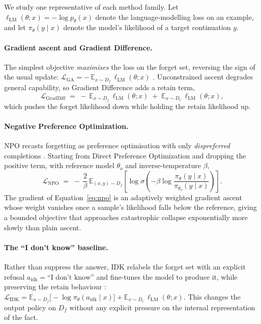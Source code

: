 We study one representative of each method family. Let $\ell_{\mathrm{LM}}(\theta; x) = -\log
p_\theta(x)$ denote the language-modelling loss on an example, and let $\pi_\theta(y\mid x)$ denote the
model's likelihood of a target continuation $y$.

\paragraph{Gradient ascent and Gradient Difference.}
The simplest objective \emph{maximises} the loss on the forget set, reversing the sign of the usual
update: $\mathcal{L}_{\mathrm{GA}} = -\,\mathbb{E}_{x\sim D_f}\,\ell_{\mathrm{LM}}(\theta;x)$
\citep{jang2022knowledge,yao2023llmunlearning}. Unconstrained ascent degrades general capability, so
Gradient Difference adds a retain term,
\begin{equation}
  \mathcal{L}_{\mathrm{GradDiff}} \;=\; -\,\mathbb{E}_{x\sim D_f}\,\ell_{\mathrm{LM}}(\theta;x)
                                    \;+\; \mathbb{E}_{x\sim D_r}\,\ell_{\mathrm{LM}}(\theta;x),
  \label{eq:graddiff}
\end{equation}
which pushes the forget likelihood down while holding the retain likelihood up.

\paragraph{Negative Preference Optimization.}
NPO recasts forgetting as preference optimisation with only \emph{dispreferred} completions
\citep{zhang2024npo}. Starting from Direct Preference Optimization \citep{rafailov2023dpo} and dropping the
positive term, with reference model $\theta_o$ and inverse-temperature $\beta$,
\begin{equation}
  \mathcal{L}_{\mathrm{NPO}} \;=\; -\,\frac{2}{\beta}\,\mathbb{E}_{(x,y)\sim D_f}
  \left[\log \sigma\!\left(-\beta \log \frac{\pi_\theta(y\mid x)}{\pi_{\theta_o}(y\mid x)}\right)\right].
  \label{eq:npo}
\end{equation}
The gradient of Equation~\eqref{eq:npo} is an adaptively weighted gradient ascent whose weight vanishes
once a sample's likelihood falls below the reference, giving a bounded objective that approaches
catastrophic collapse exponentially more slowly than plain ascent.

\paragraph{The ``I don't know'' baseline.}
Rather than suppress the answer, IDK relabels the forget set with an explicit refusal $a_{\mathrm{idk}} =
\text{``I don't know''}$ and fine-tunes the model to produce it, while preserving the retain behaviour
\citep{maini2024tofu}:
$\mathcal{L}_{\mathrm{IDK}} = \mathbb{E}_{x\sim D_f}\bigl[-\log \pi_\theta(a_{\mathrm{idk}}\mid x)\bigr]
+ \mathbb{E}_{x\sim D_r}\,\ell_{\mathrm{LM}}(\theta;x)$. This changes the output policy on $D_f$ without
any explicit pressure on the internal representation of the fact.

